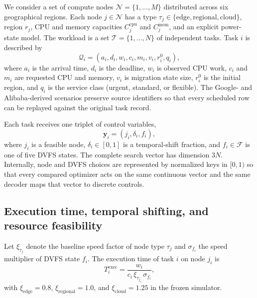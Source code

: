\documentclass[preprint,12pt]{elsarticle}
\begin{document}
We consider a set of compute nodes $\mathcal{N}=\{1,\ldots,M\}$ distributed across six geographical regions. Each node $j\in\mathcal{N}$ has a type $\tau_j\in\{\text{edge},\text{regional},\text{cloud}\}$, region $r_j$, CPU and memory capacities $C^{\mathrm{cpu}}_j$ and $C^{\mathrm{mem}}_j$, and an explicit power-state model. The workload is a set $\mathcal{T}=\{1,\ldots,N\}$ of independent tasks. Task $i$ is described by
\begin{equation}
\mathcal{Q}_i=\left(a_i,d_i,w_i,c_i,m_i,v_i,r_i^0,q_i\right),
\end{equation}
where $a_i$ is the arrival time, $d_i$ is the deadline, $w_i$ is observed CPU work, $c_i$ and $m_i$ are requested CPU and memory, $v_i$ is migration state size, $r_i^0$ is the initial region, and $q_i$ is the service class (urgent, standard, or flexible). The Google- and Alibaba-derived scenarios preserve source identifiers so that every scheduled row can be replayed against the original task record.

Each task receives one triplet of control variables,
\begin{equation}
\mathbf{y}_i=\left(j_i,\delta_i,f_i\right),
\label{eq:decision-triplet}
\end{equation}
where $j_i$ is a feasible node, $\delta_i\in[0,1]$ is a temporal-shift fraction, and $f_i\in\mathcal{F}$ is one of five DVFS states. The complete search vector has dimension $3N$. Internally, node and DVFS choices are represented by normalized keys in $[0,1)$ so that every compared optimizer acts on the same continuous vector and the same decoder maps that vector to discrete controls.

\subsection{Execution time, temporal shifting, and resource feasibility}

Let $\xi_{\tau_j}$ denote the baseline speed factor of node type $\tau_j$ and $\sigma_{f_i}$ the speed multiplier of DVFS state $f_i$. The execution time of task $i$ on node $j_i$ is
\begin{equation}
T^{\mathrm{exec}}_i=\frac{w_i}{c_i\,\xi_{\tau_{j_i}}\,\sigma_{f_i}},
\label{eq:runtime}
\end{equation}
with $\xi_{\mathrm{edge}}=0.8$, $\xi_{\mathrm{regional}}=1.0$, and $\xi_{\mathrm{cloud}}=1.25$ in the frozen simulator.
\end{document}
